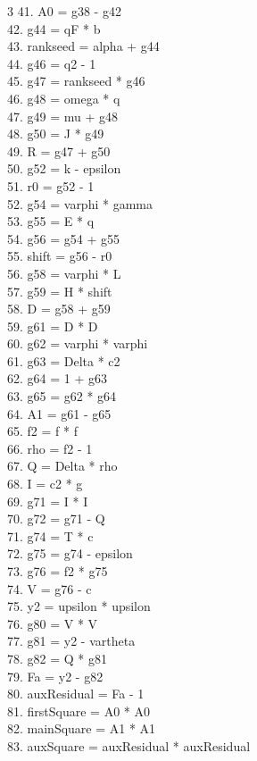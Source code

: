 \documentclass[10pt]{article}
\begin{document}
\begin{multicols}{3}
41. A0 = g38 - g42\\
42. g44 = qF * b\\
43. rankseed = alpha + g44\\
44. g46 = q2 - 1\\
45. g47 = rankseed * g46\\
46. g48 = omega * q\\
47. g49 = mu + g48\\
48. g50 = J * g49\\
49. R = g47 + g50\\
50. g52 = k - epsilon\\
51. r0 = g52 - 1\\
52. g54 = varphi * gamma\\
53. g55 = E * q\\
54. g56 = g54 + g55\\
55. shift = g56 - r0\\
56. g58 = varphi * L\\
57. g59 = H * shift\\
58. D = g58 + g59\\
59. g61 = D * D\\
60. g62 = varphi * varphi\\
61. g63 = Delta * c2\\
62. g64 = 1 + g63\\
63. g65 = g62 * g64\\
64. A1 = g61 - g65\\
65. f2 = f * f\\
66. rho = f2 - 1\\
67. Q = Delta * rho\\
68. I = c2 * g\\
69. g71 = I * I\\
70. g72 = g71 - Q\\
71. g74 = T * c\\
72. g75 = g74 - epsilon\\
73. g76 = f2 * g75\\
74. V = g76 - c\\
75. y2 = upsilon * upsilon\\
76. g80 = V * V\\
77. g81 = y2 - vartheta\\
78. g82 = Q * g81\\
79. Fa = y2 - g82\\
80. auxResidual = Fa - 1\\
81. firstSquare = A0 * A0\\
82. mainSquare = A1 * A1\\
83. auxSquare = auxResidual * auxResidual\\

\end{multicols}
\end{document}
